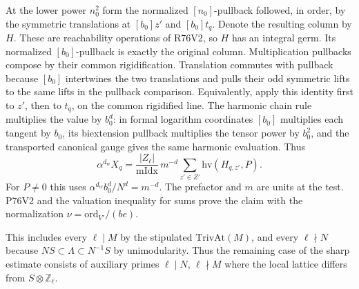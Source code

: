 At the lower power $n_0^2$ form the normalized $[n_0]$-pullback
followed, in order, by the symmetric translations at $[b_0]z'$
and $[b_0]t_q$. Denote the resulting column by $H$. These are
reachability operations of R76V2, so $H$ has an integral germ.
Its normalized $[b_0]$-pullback is exactly the original column.
Multiplication pullbacks compose by their common rigidification.
Translation commutes with pullback because $[b_0]$ intertwines
the two translations and pulls their odd symmetric lifts to the
same lifts in the pullback comparison. Equivalently, apply this
identity first to $z'$, then to $t_q$, on the common rigidified
line. The harmonic chain rule multiplies the value by $b_0^d$:
in formal logarithm coordinates $[b_0]$ multiplies each tangent
by $b_0$, its biextension pullback multiplies the tensor power
by $b_0^2$, and the transported canonical gauge gives the same
harmonic evaluation. Thus
\[
 \alpha^{d_w}X_q
  = \frac{|Z_\ell|}{\mathrm{mIdx}}\,m^{-d}
        \sum_{z'\in Z'}\mathrm{hv}(H_{q,z'},P).
\]
For $P\ne0$ this uses $\alpha^{d_w}b_0^d/N^d=m^{-d}$.
The prefactor and $m$ are units at the test. P76V2 and the
valuation inequality for sums prove the claim with the
normalization $\nu=\mathrm{ord}_{V'}/(be)$.

This includes every $\ell\mid M$ by the stipulated
$\mathrm{TrivAt}(M)$, and every $\ell\nmid N$ because
$NS\subset\Lambda\subset N^{-1}S$ by unimodularity. Thus the
remaining case of the sharp estimate consists of auxiliary
primes $\ell\mid N$, $\ell\nmid M$ where the local lattice differs
from $S\otimes\mathbb Z_\ell$.

